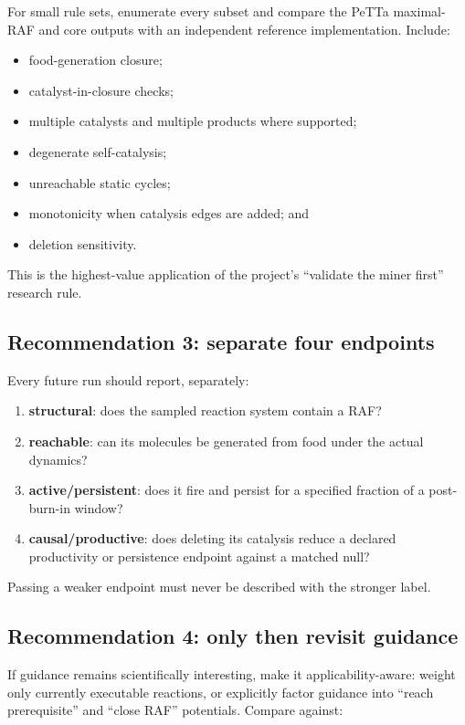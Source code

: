 \documentclass[11pt]{article}
\begin{document}
For small rule sets, enumerate every subset and compare the PeTTa maximal-RAF
and core outputs with an independent reference implementation.  Include:

\begin{itemize}
\item food-generation closure;
\item catalyst-in-closure checks;
\item multiple catalysts and multiple products where supported;
\item degenerate self-catalysis;
\item unreachable static cycles;
\item monotonicity when catalysis edges are added; and
\item deletion sensitivity.
\end{itemize}

This is the highest-value application of the project's ``validate the miner
first'' research rule.

\subsection{Recommendation 3: separate four endpoints}

Every future run should report, separately:

\begin{enumerate}
\item \textbf{structural}: does the sampled reaction system contain a RAF?
\item \textbf{reachable}: can its molecules be generated from food under the
      actual dynamics?
\item \textbf{active/persistent}: does it fire and persist for a specified
      fraction of a post-burn-in window?
\item \textbf{causal/productive}: does deleting its catalysis reduce a declared
      productivity or persistence endpoint against a matched null?
\end{enumerate}

Passing a weaker endpoint must never be described with the stronger label.

\subsection{Recommendation 4: only then revisit guidance}

If guidance remains scientifically interesting, make it applicability-aware:
weight only currently executable reactions, or explicitly factor guidance into
``reach prerequisite'' and ``close RAF'' potentials.  Compare against:
\end{document}
